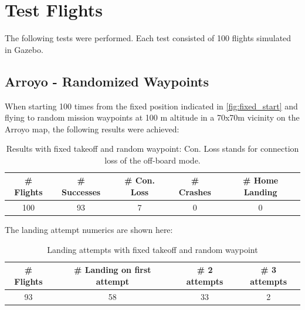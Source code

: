 \section{Test Flights}\label{sec:test_flights}

The following tests were performed. Each test consisted of 100 flights simulated in Gazebo.

\subsection{Arroyo - Randomized Waypoints}\label{subsec:eval_rand_wp}

When starting 100 times from the fixed position indicated in \cref{fig:fixed_start} and flying to random mission waypoints at 100 m altitude in a 70x70m vicinity on the Arroyo map, the following results were achieved:

\begin{table}[h]
    \begin{center}
     \caption{Results with fixed takeoff and random waypoint: Con. Loss stands for connection loss of the off-board mode.}\vspace{1ex}
     \label{tab:result_random_waypoint}
     \begin{tabular}{|c|c|c|c|c|}
     \hline
     \# Flights & \# Successes & \# Con. Loss & \# Crashes & \# Home Landing\\ \hline \hline
     100 & 93 & 7 & 0 & 0 \\
     \hline
     \end{tabular}
    \end{center}
    \end{table}

    The landing attempt numerics are shown here:

    \begin{table}[h]
        \begin{center}
         \caption{Landing attempts with fixed takeoff and random waypoint}\vspace{1ex}
         \label{tab:land_nums_random_waypoint}
         \begin{tabular}{|c|c|c|c|}
         \hline
         \# Flights & \# Landing on first attempt & \# 2 attempts & \# 3 attempts\\ \hline \hline
         93 & 58 & 33 & 2 \\
         \hline
         \end{tabular}
        \end{center}
    \end{table}

